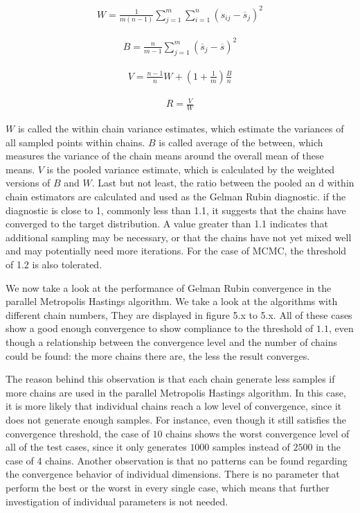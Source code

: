 \begin{align}
W = \frac 1 {m(n-1)}\sum_{j=1}^m \sum_{i=1}^n (s_{ij} - \overline{s}_j)^2
\end{align}

\begin{align}
B = \frac n {m-1} \sum_{j=1}^m (\overline{s}_j - \overline{s})^2
\end{align}

\begin{align}
V = \frac {n-1}n W + (1 + \frac 1 m)\frac B n
\end{align}

\begin{align}
R = \frac V W
\end{align}

$W$ is called the within chain variance estimates, which estimate the variances of all sampled points within chains. $B$ is called average of the between, which measures the variance of the chain means around the overall mean of these means. $V$ is the pooled variance estimate, which is calculated by the weighted versions of $B$ and $W$. Last but not least, the ratio between the pooled an d within chain estimators are calculated and used as the Gelman Rubin diagnostic. if the diagnostic is close to 1, commonly less than 1.1, it suggests that the chains have converged to the target distribution. A value greater than 1.1 indicates that additional sampling may be necessary, or that the chains have not yet mixed well and may potentially need more iterations.\cite{gr_calc} For the case of MCMC, the threshold of 1.2 is also tolerated.\cite{gr1.2}

We now take a look at the performance of Gelman Rubin convergence in the parallel Metropolis Hastings algorithm. We take a look at the algorithms with different chain numbers, They are displayed in figure 5.x to 5.x. All of these cases show a good enough convergence to show compliance to the threshold of $1.1$, even though a relationship between the convergence level and the number of chains could be found: the more chains there are, the less the result converges.

The reason behind this observation is that each chain generate less samples if more chains are used in the parallel Metropolis Hastings algorithm. In this case, it is more likely that individual chains reach a low level of convergence, since it does not generate enough samples. For instance, even though it still satisfies the convergence threshold, the case of $10$ chains shows the worst convergence level of all of the test cases, since it only generates $1000$ samples instead of $2500$ in the case of $4$ chains. Another observation is that no patterns can be found regarding the convergence behavior of individual dimensions. There is no parameter that perform the best or the worst in every single case, which means that further investigation of individual parameters is not needed.

